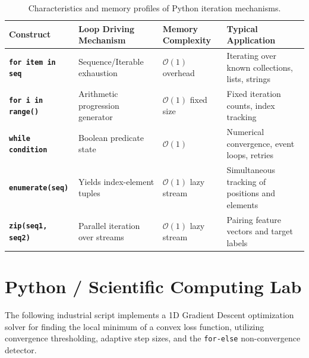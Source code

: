 \begin{table}[htbp]
\centering
\small
\begin{tabular}{p{2.6cm} p{3.0cm} p{2.8cm} p{4.2cm}}
\hline
\textbf{Construct} & \textbf{Loop Driving Mechanism} & \textbf{Memory Complexity} & \textbf{Typical Application} \\
\hline
\textbf{\texttt{for item in seq}} & Sequence/Iterable exhaustion & $\mathcal{O}(1)$ overhead & Iterating over known collections, lists, strings \\
\textbf{\texttt{for i in range()}} & Arithmetic progression generator & $\mathcal{O}(1)$ fixed size & Fixed iteration counts, index tracking \\
\textbf{\texttt{while condition}} & Boolean predicate state & $\mathcal{O}(1)$ & Numerical convergence, event loops, retries \\
\textbf{\texttt{enumerate(seq)}} & Yields index-element tuples & $\mathcal{O}(1)$ lazy stream & Simultaneous tracking of positions and elements \\
\textbf{\texttt{zip(seq1, seq2)}} & Parallel iteration over streams & $\mathcal{O}(1)$ lazy stream & Pairing feature vectors and target labels \\
\hline
\end{tabular}
\caption{Characteristics and memory profiles of Python iteration mechanisms.}
\label{tab:iteration_summary}
\end{table}

\section{Python / Scientific Computing Lab}

The following industrial script implements a 1D Gradient Descent optimization solver for finding the local minimum of a convex loss function, utilizing convergence thresholding, adaptive step sizes, and the \texttt{for-else} non-convergence detector.

